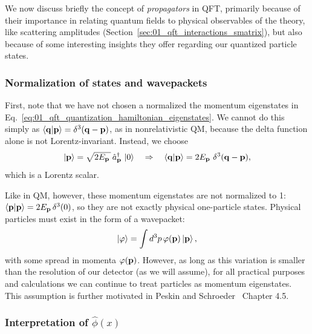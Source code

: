 We now discuss briefly the concept of \textit{propagators} in QFT, primarily because of their importance in relating quantum fields to physical observables of the theory, like scattering amplitudes (Section~\ref{sec:01_qft_interactions_smatrix}), but also because of some interesting insights they offer regarding our quantized particle states.

\subsubsection{Normalization of states and wavepackets}

First, note that we have not chosen a normalized the momentum eigenstates in Eq.~\ref{eq:01_qft_quantization_hamiltonian_eigenstates}.
We cannot do this simply as $\braket{\mathbf{q}|\mathbf{p}} = \delta^3(\mathbf{q} - \mathbf{p})$, as in nonrelativistic QM, because the delta function alone is not Lorentz-invariant.
Instead, we choose
\begin{equation}
	\label{eq:01_qft_quantization_normalization}
	\ket{\mathbf{p}} = \sqrt{2E_{\mathbf{p}}\,}\, \hat a^\dagger_{\mathbf{p}}\, \ket{0} \quad \Rightarrow \quad \braket{\mathbf{q}|\mathbf{p}} = 2E_{\mathbf{p}}\,\, \delta^3(\mathbf{q} - \mathbf{p}),
\end{equation}
which is a Lorentz scalar.

Like in QM, however, these momentum eigenstates are not normalized to 1: $\braket{\mathbf{p}|\mathbf{p}} = 2E_{\mathbf{p}}\,\delta^3(0)$, so they are not exactly physical one-particle states.
Physical particles must exist in the form of a wavepacket:
\begin{equation}
	\label{eq:01_qft_quantization_wavepacket}
	\ket{\varphi} = \int d^3p\, \varphi(\mathbf{p})\ket{\mathbf{p}},
\end{equation}
with some spread in momenta $\varphi(\mathbf{p})$.
However, as long as this variation is smaller than the resolution of our detector (as we will assume), for all practical purposes and calculations we can continue to treat particles as momentum eigenstates.
This assumption is further motivated in Peskin and Schroeder~\cite{Peskin:1995ev} Chapter 4.5.

\subsubsection{Interpretation of $\hat \phi(x)$}

